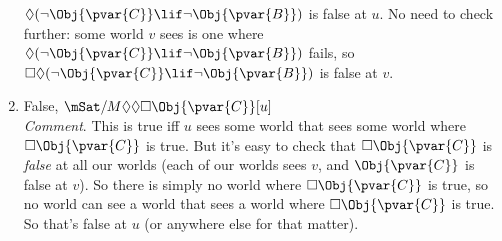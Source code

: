 \documentclass[../../../include/open-logic-section]{subfiles}
\begin{document}
\begin{prob}
\begin{ans}
\begin{enumerate}
        $\Diamond(\lnot \Obj{\pvar{C}}\lif\lnot \Obj{\pvar{B}})$ is false at $u$. 
        No need to check further: some world $v$ sees is one 
        where $\Diamond(\lnot \Obj{\pvar{C}}\lif\lnot \Obj{\pvar{B}})$ fails, so 
        $\Box\Diamond(\lnot \Obj{\pvar{C}}\lif\lnot \Obj{\pvar{B}})$ is false at $v$. 
        \item False, $\mSat/{M}{\Diamond\Diamond\Box \Obj{\pvar{C}}}[u]$\\
        \emph{Comment}. This is true iff $u$ sees some world that sees
        some world where $\Box \Obj{\pvar{C}}$ is true. But it's easy to check 
        that $\Box \Obj{\pvar{C}}$ is \emph{false} at all our worlds (each of our worlds 
        sees $v$, and $\Obj{\pvar{C}}$ is false at $v$). So there is simply no world where
        $\Box \Obj{\pvar{C}}$ is true, so no world can see a world that sees
        a world where $\Box \Obj{\pvar{C}}$ is true. So that's false at $u$ (or anywhere
        else for that matter).
        \end{enumerate}
    
    \end{ans}
    
    \end{prob}
    
\end{document}
